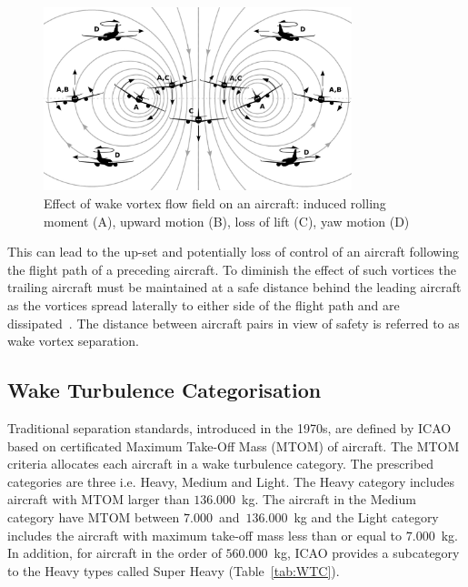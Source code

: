\begin{figure}[h]
    \centering
    \includegraphics[width=0.8\textwidth]{graphics/reaction_in_wake.jpg}
    \caption[Wake vortex encounter]{Effect of wake vortex flow field on an aircraft: induced rolling moment (A), upward motion (B), loss of lift (C), yaw motion (D)~\cite[p.~33]{Hallock2018Apr}} 
    \label{fig:vortex_encounter}
\end{figure}

This can lead to the up-set and potentially loss of control of an aircraft following the flight path of a preceding aircraft.
To diminish the effect of such vortices the trailing aircraft must be maintained at a safe distance behind the leading aircraft as the vortices spread laterally to either side of the flight path and are dissipated~\cite{Breitsamter2011Feb}.
The distance between aircraft pairs in view of safety is referred to as wake vortex separation. 

\subsection{Wake Turbulence Categorisation}
Traditional separation standards, introduced in the 1970s, are defined by ICAO based on certificated Maximum Take-Off Mass (MTOM) of aircraft. The MTOM criteria allocates each aircraft in a wake turbulence category. The prescribed categories are three i.e. Heavy, Medium and Light.
The Heavy category includes aircraft with MTOM larger than $136.000$~kg. The aircraft in the Medium category have MTOM between $7.000$~and~$136.000$~kg and the Light category includes the aircraft with maximum take-off mass less than or equal to $7.000$~kg.
In addition, for aircraft in the order of $560.000$~kg, ICAO provides a subcategory to the Heavy types called Super Heavy (Table~\ref{tab:WTC}). 

